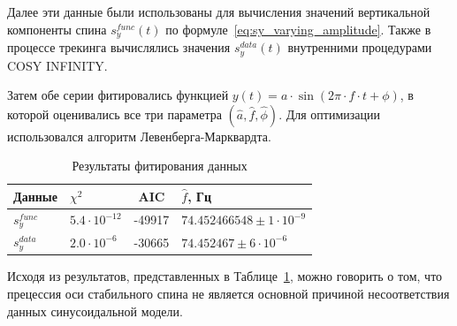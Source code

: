 Далее эти данные были использованы для вычисления значений вертикальной компоненты спина $s_y^{func}(t)$ по формуле~\ref{eq:sy_varying_amplitude}. Также в процессе трекинга вычислялись значения $s_y^{data}(t)$ внутренними процедурами COSY INFINITY.

Затем обе серии фитировались функцией $y(t) = a\cdot \sin(2\pi\cdot f\cdot t + \phi)$, в которой оценивались все три параметра $(\hat a,\hat f,\hat \phi)$. Для оптимизации использовался алгоритм Левенберга-Марквардта.

\begin{table}[h]%
	\centering
	\changecaptionwidth\captionwidth{12cm}
	\caption{Результаты фитирования данных\label{tbl:smp-comparison}}
	\begin{tabular}{l|lcl}
		\toprule
		Данные & $\chi^2$ & AIC\footnotemark & $\hat f$, Гц\\
		\midrule
		$s_y^{func}$& $5.4\cdot 10^{-12}$& -49917& $74.452466548 \pm 1\cdot 10^{-9}$\\
		$s_y^{data}$& $2.0\cdot 10^{-6}$& -30665 & $74.452467 \pm 6\cdot 10^{-6}$\\\bottomrule
	\end{tabular}
\end{table}

Исходя из результатов, представленных в Таблице~\ref{tbl:smp-comparison}, можно говорить о том, что прецессия оси стабильного спина не является основной причиной несоответствия данных синусоидальной модели.

